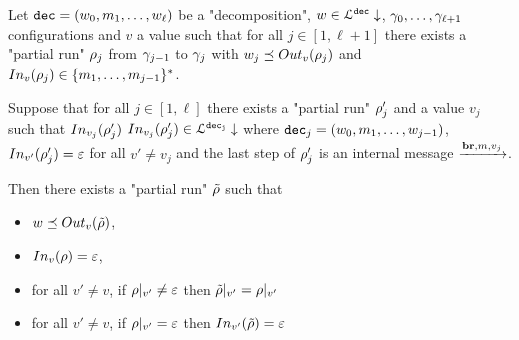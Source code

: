 \begin{lemma}
	\label{lem:follower-composition}
	Let $\mathtt{dec} = (w_0, m_1, \ldots, w_\ell)$ be a "decomposition", $w \in \mathcal{L}^{\mathtt{\mathtt{dec}}}\downarrow$, $\gamma_0, \ldots, \gamma_{\ell+1}$ configurations and $v$ a value such that for all $j \in [1,\ell+1]$ there exists a "partial run" $\rho_j$ from $\gamma_{j-1}$ to $\gamma_{j}$ with $w_j \subword \voutput{v}{\run_j}$ and $\vinput{v}{\run_j} \in \set{m_1,\ldots, m_{j-1}}^*$.
	
	Suppose that for all $j \in [1,\ell]$ there exists a "partial run" $\rho'_j$ and a value $v_j$ such that $\vinput{v_j}{\run'_j}$ $\vinput{v_j}{\run'_j} \in \langdecdown{\decsymb_j}$ where $\mathtt{dec}_j = (w_0, m_1, \ldots, w_{j-1})$, $\vinput{v'}{\run'_j} = \varepsilon$ for all $v' \neq v_j$ and the last step of $\rho'_j$ is an internal message $\xrightarrow{\textbf{br}, m, v_j}$.
	
	Then there exists a "partial run" $\Tilde{\rho}$ such that 
	\begin{itemize}
		\item $w \subword \voutput{v}{\Tilde{\run}}$, 
		
		\item $\vinput{v}{\run} = \varepsilon$,
		
		\item for all $v' \neq v$, if ${\rho}|_{v'} \neq \varepsilon$ then ${\Tilde{\rho}}|_{v'} = {\rho}|_{v'}$
		
		\item for all $v' \neq v$, if ${\rho}|_{v'} = \varepsilon$ then $\vinput{v'}{\Tilde{\run}} = \varepsilon$
\end{itemize}
\end{lemma}


